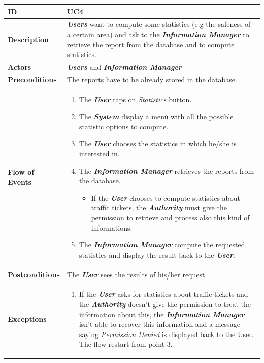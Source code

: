 \documentclass{report}
\begin{document}
\begin{tabularx}{\linewidth}{| l | X |}
	\hline
	\textbf{ID} & UC4\\
	
	\hline
	\textbf{Description} & \textbf{\textit{Users}} want to compute some statistics (e.g the safeness of a certain area) and ask to the \textbf{\textit{Information Manager}} to  retrieve the report from the database and to compute statistics.\\
	
	\hline
	\textbf{Actors} & \textbf{\textit{Users}} and \textbf{\textit{Information Manager}}\\
	
	\hline
	\textbf{Preconditions} & The reports have to be already stored in the database. \\
	
	\hline
	\textbf{Flow of Events} & \parbox{0.7\textwidth}{\begin{enumerate}
			\item The \textbf{\textit{User}} taps on \textit{Statistics} button.
			\item The \textbf{\textit{System}} display a menù with all the possible statistic options to compute.
			\item The \textbf{\textit{User}} chooses the statistics in which he/she is interested in.
			
			\item The \textbf{\textit{Information Manager}} retrieves the reports from the database.
			\begin{itemize}
			\item If the \textbf{\textit{User}} chooses to compute statistics about traffic tickets, the \textbf{\textit{Authority}} must give the permission to retrieve and process also this kind of informations.
			\end{itemize}
			
			\item The \textbf{\textit{Information Manager}} compute the requested statistics and display the result back to the \textbf{\textit{User}}.
					
			
	\end{enumerate}}\\
	
	\hline
	\textbf{Postconditions} & The \textbf{\textit{User}} sees the results of his/her request.\\
	
	\hline
	\textbf{Exceptions} & \parbox{0.7\textwidth}{ \begin{enumerate}
			\item If the \textbf{\textit{User}} asks for statistics about traffic tickets and the \textbf{\textit{Authority}} doesn't give the permission to treat the information about this, the \textbf{\textit{Information Manager}} isn't able to recover this information and a message saying \textit{Permission Denied} is displayed back to the User. The flow restart from point 3. 
		\end{enumerate}}\\
	
	\hline
	
\end{tabularx}
\end{document}
